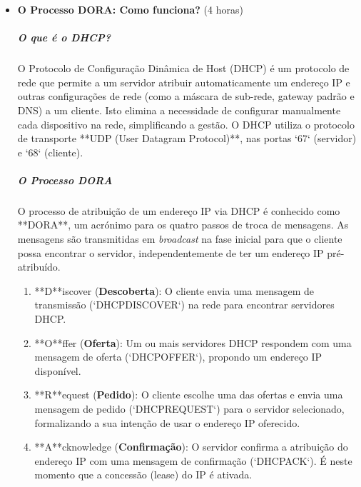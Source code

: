\documentclass[10pt,a4paper]{article}
\begin{document}
	\begin{itemize}
		\item \textbf{O Processo DORA: Como funciona?} (4 horas)
		\subparagraph{O que é o DHCP?} O Protocolo de Configuração Dinâmica de Host (DHCP) é um protocolo de rede que permite a um servidor atribuir automaticamente um endereço IP e outras configurações de rede (como a máscara de sub-rede, gateway padrão e DNS) a um cliente. Isto elimina a necessidade de configurar manualmente cada dispositivo na rede, simplificando a gestão. O DHCP utiliza o protocolo de transporte **UDP (User Datagram Protocol)**, nas portas `67` (servidor) e `68` (cliente).
		\subparagraph{O Processo DORA} O processo de atribuição de um endereço IP via DHCP é conhecido como **DORA**, um acrónimo para os quatro passos de troca de mensagens. As mensagens são transmitidas em \textit{broadcast} na fase inicial para que o cliente possa encontrar o servidor, independentemente de ter um endereço IP pré-atribuído.
		\begin{enumerate}
			\item **D**iscover (\textbf{Descoberta}): O cliente envia uma mensagem de transmissão (`DHCPDISCOVER`) na rede para encontrar servidores DHCP.
			\item **O**ffer (\textbf{Oferta}): Um ou mais servidores DHCP respondem com uma mensagem de oferta (`DHCPOFFER`), propondo um endereço IP disponível.
			\item **R**equest (\textbf{Pedido}): O cliente escolhe uma das ofertas e envia uma mensagem de pedido (`DHCPREQUEST`) para o servidor selecionado, formalizando a sua intenção de usar o endereço IP oferecido.
			\item **A**cknowledge (\textbf{Confirmação}): O servidor confirma a atribuição do endereço IP com uma mensagem de confirmação (`DHCPACK`). É neste momento que a concessão (lease) do IP é ativada.
		\end{enumerate}
		

\end{itemize}
\end{document}
